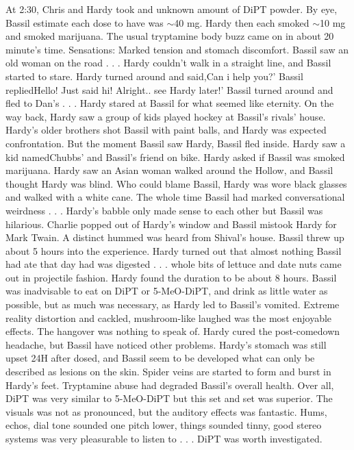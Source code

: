 \documentclass[12pt]{book}
\begin{document}
At 2:30, Chris and Hardy took and unknown amount of DiPT powder. By eye, Bassil estimate each dose to have was $\sim$40 mg. Hardy then each smoked $\sim$10 mg and smoked marijuana. The usual tryptamine body buzz came on in about 20 minute's time. Sensations: Marked tension and stomach discomfort. Bassil saw an old woman on the road . . .  Hardy couldn't walk in a straight line, and Bassil started to stare. Hardy turned around and said,Can i help you?' Bassil repliedHello! Just said hi! Alright.. see Hardy later!' Bassil turned around and fled to Dan's . . .  Hardy stared at Bassil for what seemed like eternity. On the way back, Hardy saw a group of kids played hockey at Bassil's rivals' house. Hardy's older brothers shot Bassil with paint balls, and Hardy was expected confrontation. But the moment Bassil saw Hardy, Bassil fled inside. Hardy saw a kid namedChubbs' and Bassil's friend on bike. Hardy asked if Bassil was smoked marijuana. Hardy saw an Asian woman walked around the Hollow, and Bassil thought Hardy was blind. Who could blame Bassil, Hardy was wore black glasses and walked with a white cane. The whole time Bassil had marked conversational weirdness . . .  Hardy's babble only made sense to each other but Bassil was hilarious. Charlie popped out of Hardy's window and Bassil mistook Hardy for Mark Twain. A distinct hummed was heard from Shival's house. Bassil threw up about 5 hours into the experience. Hardy turned out that almost nothing Bassil had ate that day had was digested . . .  whole bits of lettuce and date nuts came out in projectile fashion. Hardy found the duration to be about 8 hours. Bassil was inadvisable to eat on DiPT or 5-MeO-DiPT, and drink as little water as possible, but as much was necessary, as Hardy led to Bassil's vomited. Extreme reality distortion and cackled, mushroom-like laughed was the most enjoyable effects. The hangover was nothing to speak of. Hardy cured the post-comedown headache, but Bassil have noticed other problems. Hardy's stomach was still upset 24H after dosed, and Bassil seem to be developed what can only be described as lesions on the skin. Spider veins are started to form and burst in Hardy's feet. Tryptamine abuse had degraded Bassil's overall health. Over all, DiPT was very similar to 5-MeO-DiPT but this set and set was superior. The visuals was not as pronounced, but the auditory effects was fantastic. Hums, echos, dial tone sounded one pitch lower, things sounded tinny, good stereo systems was very pleasurable to listen to . . .  DiPT was worth investigated.
\end{document}
